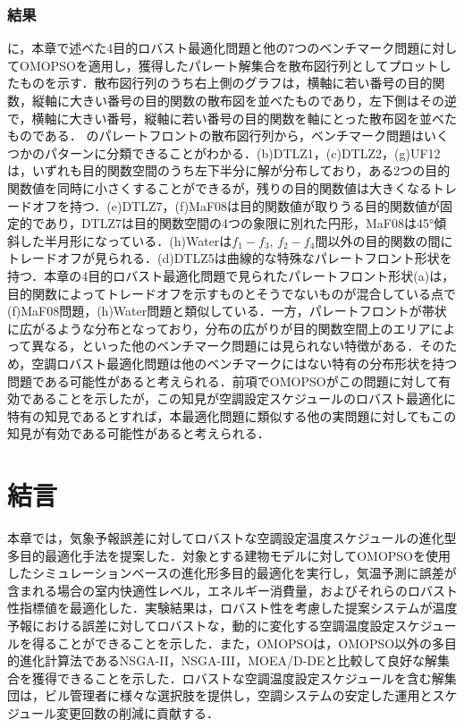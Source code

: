 \subsubsection{結果}
に，本章で述べた4目的ロバスト最適化問題と他の7つのベンチマーク問題に対してOMOPSOを適用し，獲得したパレート解集合を散布図行列としてプロットしたものを示す．散布図行列のうち右上側のグラフは，横軸に若い番号の目的関数，縦軸に大きい番号の目的関数の散布図を並べたものであり，左下側はその逆で，横軸に大きい番号，縦軸に若い番号の目的関数を軸にとった散布図を並べたものである．
のパレートフロントの散布図行列から，ベンチマーク問題はいくつかのパターンに分類できることがわかる．(b)DTLZ1，(c)DTLZ2，(g)UF12は，いずれも目的関数空間のうち左下半分に解が分布しており，ある2つの目的関数値を同時に小さくすることができるが，残りの目的関数値は大きくなるトレードオフを持つ．(e)DTLZ7，(f)MaF08は目的関数値が取りうる目的関数値が固定的であり，DTLZ7は目的関数空間の4つの象限に別れた円形，MaF08は45°傾斜した半月形になっている．(h)Waterは$f_1-f_3$, $f_2-f_4$間以外の目的関数の間にトレードオフが見られる．(d)DTLZ5は曲線的な特殊なパレートフロント形状を持つ．本章の4目的ロバスト最適化問題で見られたパレートフロント形状(a)は，目的関数によってトレードオフを示すものとそうでないものが混合している点で(f)MaF08問題，(h)Water問題と類似している．一方，パレートフロントが帯状に広がるような分布となっており，分布の広がりが目的関数空間上のエリアによって異なる，といった他のベンチマーク問題には見られない特徴がある．そのため，空調ロバスト最適化問題は他のベンチマークにはない特有の分布形状を持つ問題である可能性があると考えられる．前項でOMOPSOがこの問題に対して有効であることを示したが，この知見が空調設定スケジュールのロバスト最適化に特有の知見であるとすれば，本最適化問題に類似する他の実問題に対してもこの知見が有効である可能性があると考えられる．

\section{結言}
本章では，気象予報誤差に対してロバストな空調設定温度スケジュールの進化型多目的最適化手法を提案した．対象とする建物モデルに対してOMOPSOを使用したシミュレーションベースの進化形多目的最適化を実行し，気温予測に誤差が含まれる場合の室内快適性レベル，エネルギー消費量，およびそれらのロバスト性指標値を最適化した．実験結果は，ロバスト性を考慮した提案システムが温度予報における誤差に対してロバストな，動的に変化する空調温度設定スケジュールを得ることができることを示した．また，OMOPSOは，OMOPSO以外の多目的進化計算法であるNSGA-II，NSGA-III，MOEA/D-DEと比較して良好な解集合を獲得できることを示した．ロバストな空調温度設定スケジュールを含む解集団は，ビル管理者に様々な選択肢を提供し，空調システムの安定した運用とスケジュール変更回数の削減に貢献する．


